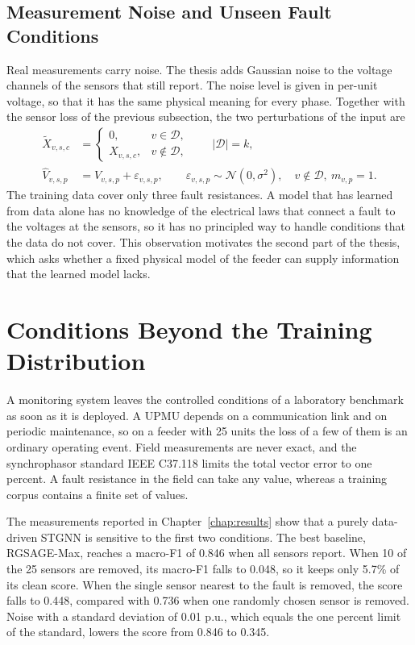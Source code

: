 \documentclass[MTech]{ugthesis}
\begin{document}
\subsection{Measurement Noise and Unseen Fault Conditions}

Real measurements carry noise. The thesis adds Gaussian noise to the voltage channels of the sensors that still report. The noise level is given in per-unit voltage, so that it has the same physical meaning for every phase. Together with the sensor loss of the previous subsection, the two perturbations of the input are
\begin{align}
\tilde{X}_{v,s,c} &=
\begin{cases}
0, & v\in\mathcal{D},\\
X_{v,s,c}, & v\notin\mathcal{D},
\end{cases}
\qquad |\mathcal{D}|=k, \label{eq:dropout}\\
\hat{V}_{v,s,p} &= V_{v,s,p}+\varepsilon_{v,s,p},
\qquad \varepsilon_{v,s,p}\sim\mathcal{N}(0,\sigma^{2}),\quad v\notin\mathcal{D},\ m_{v,p}=1. \label{eq:noise}
\end{align}
The training data cover only three fault resistances. A model that has learned from data alone has no knowledge of the electrical laws that connect a fault to the voltages at the sensors, so it has no principled way to handle conditions that the data do not cover. This observation motivates the second part of the thesis, which asks whether a fixed physical model of the feeder can supply information that the learned model lacks.

\section{Conditions Beyond the Training Distribution}

A monitoring system leaves the controlled conditions of a laboratory benchmark as soon as it is deployed. A \ac{UPMU} depends on a communication link and on periodic maintenance, so on a feeder with 25 units the loss of a few of them is an ordinary operating event. Field measurements are never exact, and the synchrophasor standard IEEE C37.118 limits the total vector error to one percent. A fault resistance in the field can take any value, whereas a training corpus contains a finite set of values.

The measurements reported in Chapter~\ref{chap:results} show that a purely data-driven \ac{STGNN} is sensitive to the first two conditions. The best baseline, RGSAGE-Max, reaches a macro-F1 of 0.846 when all sensors report. When 10 of the 25 sensors are removed, its macro-F1 falls to 0.048, so it keeps only 5.7\% of its clean score. When the single sensor nearest to the fault is removed, the score falls to 0.448, compared with 0.736 when one randomly chosen sensor is removed. Noise with a standard deviation of 0.01 p.u., which equals the one percent limit of the standard, lowers the score from 0.846 to 0.345.
\end{document}
